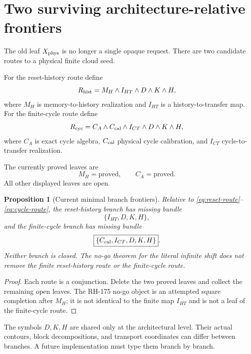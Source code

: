 \documentclass[12pt]{article}
\newtheorem{proposition}[theorem]{Proposition}
\theoremstyle{remark}
\begin{document}
\section{Two surviving architecture-relative frontiers}

The old leaf $X_{\rm phys}$ is no longer a single opaque request.  There are
two candidate routes to a physical finite cloud seed.

For the reset-history route define
\begin{equation}\label{eq:reset-route}
 R_{\rm hist}=
 M_H\wedge I_{HT}\wedge D\wedge K\wedge H,
\end{equation}
where $M_H$ is memory-to-history realization and $I_{HT}$ is a
history-to-transfer map.  For the finite-cycle route define
\begin{equation}\label{eq:cycle-route}
 R_{\rm cyc}=
 C_A\wedge C_{\rm cal}\wedge I_{CT}
 \wedge D\wedge K\wedge H,
\end{equation}
where $C_A$ is exact cycle algebra, $C_{\rm cal}$ physical cycle calibration,
and $I_{CT}$ cycle-to-transfer realization.

The currently proved leaves are
\[
 M_H=\text{proved},
 \qquad C_A=\text{proved}.
\]
All other displayed leaves are open.

\begin{proposition}[Current minimal branch frontiers]\label{prop:frontier}
Relative to \eqref{eq:reset-route}--\eqref{eq:cycle-route}, the reset-history
branch has missing bundle
\begin{equation}\label{eq:hist-frontier}
 \boxed{\{I_{HT},D,K,H\}},
\end{equation}
and the finite-cycle branch has missing bundle
\begin{equation}\label{eq:cycle-frontier}
 \boxed{\{C_{\rm cal},I_{CT},D,K,H\}}.
\end{equation}
Neither branch is closed.  The no-go theorem for the literal infinite shift
does not remove the finite reset-history route or the finite-cycle route.
\end{proposition}

\begin{proof}
Each route is a conjunction.  Delete the two proved leaves and collect the
remaining open leaves.  The RH-175 no-go object is an attempted square
completion after $M_H$; it is not identical to the finite map $I_{HT}$ and is
not a leaf of the finite-cycle route.
\end{proof}

The symbols $D,K,H$ are shared only at the architectural level.  Their actual
contours, block decompositions, and transport coordinates can differ between
branches.  A future implementation must type them branch by branch.
\end{document}
